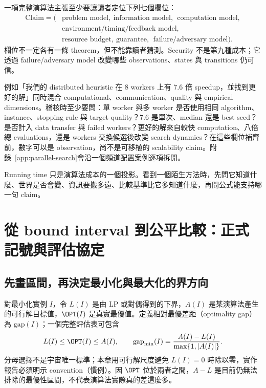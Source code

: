 \documentclass[11pt,a4paper,oneside,openany]{book}
\begin{document}
\begin{definition}
一項完整演算法主張至少要讓讀者定位下列七個欄位：
\[
 \begin{aligned}
 \text{Claim}=(&\text{problem model},\ \text{information model},\
 \ \text{computation model},\\
 &\text{environment/timing/feedback model},\\
 &\text{resource budget},\ \text{guarantee},\
 \ \text{failure/adversary model}).
 \end{aligned}
\]
欄位不一定各有一條 theorem，但不能靠讀者猜測。Security 不是第九種成本；它透過 failure/adversary model 改變哪些 observations、states 與 transitions 仍可信。
\end{definition}

例如「我們的 distributed heuristic 在 8 workers 上有 7.6 倍 speedup，並找到更好的解」同時混合 computational、communication、quality 與 empirical dimensions。稽核時至少要問：單 worker 與多 worker 是否使用相同 algorithm、instance、stopping rule 與 target quality？7.6 是單次、median 還是 best seed？是否計入 data transfer 與 failed workers？更好的解來自較快 computation、八倍總 evaluations，還是 workers 交換候選後改變 search dynamics？在這些欄位補齊前，數字可以是 observation，尚不是可移植的 scalability claim。附錄~\ref{app:parallel-search}會沿一個頻道配置案例逐項拆開。

\begin{coreintuition}
Running time 只是演算法成本的一個投影。看到一個陌生方法時，先問它知道什麼、世界是否會變、資訊要搬多遠、比較基準比它多知道什麼，再問公式能支持哪一句 claim。
\end{coreintuition}

\section{從 bound interval 到公平比較：正式記號與評估協定}
\subsection{先畫區間，再決定最小化與最大化的界方向}
對最小化實例 $I$，令 $L(I)$ 是由 LP 或對偶得到的下界，$A(I)$ 是某演算法產生的可行解目標值，$\OPT(I)$ 是真實最優值。定義相對最優差距（optimality gap）為 $\mathrm{gap}(I)$；一個完整評估表可包含
\[
 L(I)\le \OPT(I)\le A(I),\qquad
 \mathrm{gap}_{\min}(I)=
 \frac{A(I)-L(I)}{\max\{1,|A(I)|\}}.
\]
分母選擇不是宇宙唯一標準；本章用可行解尺度避免 $L(I)=0$ 時除以零，實作報告必須明示 convention（慣例）。因 $\OPT$ 位於兩者之間，$A-L$ 是目前仍無法排除的最優性區間，不代表演算法實際真的差這麼多。
\end{document}
